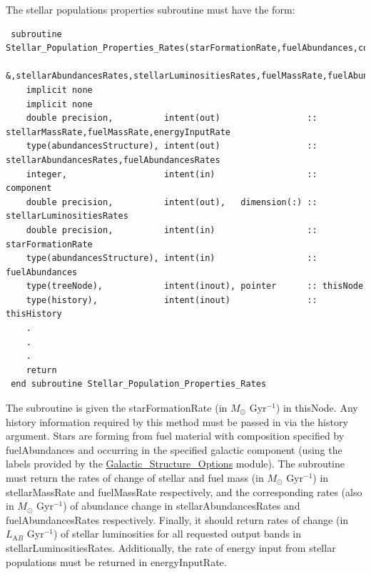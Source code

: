The stellar populations properties subroutine must have the form:
\begin{verbatim}
 subroutine Stellar_Population_Properties_Rates(starFormationRate,fuelAbundances,component,thisNode,thisHistory,stellarMassRate&
       &,stellarAbundancesRates,stellarLuminositiesRates,fuelMassRate,fuelAbundancesRates,energyInputRate)
    implicit none
    implicit none
    double precision,          intent(out)                 :: stellarMassRate,fuelMassRate,energyInputRate
    type(abundancesStructure), intent(out)                 :: stellarAbundancesRates,fuelAbundancesRates
    integer,                   intent(in)                  :: component
    double precision,          intent(out),   dimension(:) :: stellarLuminositiesRates
    double precision,          intent(in)                  :: starFormationRate
    type(abundancesStructure), intent(in)                  :: fuelAbundances
    type(treeNode),            intent(inout), pointer      :: thisNode
    type(history),             intent(inout)               :: thisHistory
    .
    .
    .
    return
 end subroutine Stellar_Population_Properties_Rates
\end{verbatim}
The subroutine is given the {\normalfont \ttfamily starFormationRate} (in $M_\odot$ Gyr$^{-1}$) in {\normalfont \ttfamily thisNode}. Any history information required by this method must be passed in via the {\normalfont \ttfamily history} argument. Stars are forming from fuel material with composition specified by {\normalfont \ttfamily fuelAbundances} and occurring in the specified galactic {\normalfont \ttfamily component} (using the labels provided by the \hyperlink{galactic_structure.options.F90:galactic_structure_options}{{\normalfont \ttfamily Galactic\_Structure\_Options}} module). The subroutine must return the rates of change of stellar and fuel mass (in $M_\odot$ Gyr$^{-1}$) in {\normalfont \ttfamily stellarMassRate} and {\normalfont \ttfamily fuelMassRate} respectively, and the corresponding rates (also in $M_\odot$ Gyr$^{-1}$) of abundance change in {\normalfont \ttfamily stellarAbundancesRates} and {\normalfont \ttfamily fuelAbundancesRates} respectively. Finally, it should return rates of change (in $L_{\mathrm AB}$ Gyr$^{-1}$) of stellar luminosities for all requested output bands in {\normalfont \ttfamily stellarLuminositiesRates}. Additionally, the rate of energy input from stellar 
populations must be returned in {\normalfont \ttfamily energyInputRate}.

